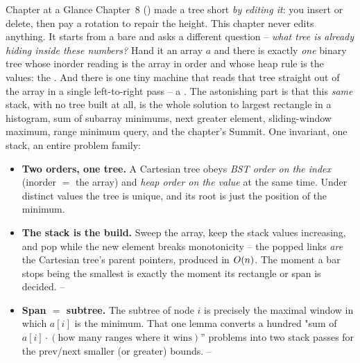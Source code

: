 
\begin{chaptertheorybox}{Chapter at a Glance}
Chapter~8 () made a tree short \emph{by editing it}: you insert or delete, then pay a
rotation to repair the height. This chapter never edits anything. It starts from a bare
 and asks a different question -- \emph{what tree is already hiding inside these
numbers?} Hand it an array $a$ and there is exactly \emph{one} binary tree whose inorder reading is
the array in order and whose heap rule is the values: the . And there is one
tiny machine that reads that tree straight out of the array in a single left-to-right pass -- a
. The astonishing part is that this \emph{same} stack, with no tree built at
all, is the whole solution to largest rectangle in a histogram, sum of subarray minimums, next
greater element, sliding-window maximum, range minimum query, and the chapter's Summit. One
invariant, one stack, an entire problem family:
\begin{itemize}[nosep]
  \item \textbf{Two orders, one tree.} A Cartesian tree obeys \emph{BST order on the index} (inorder
        $=$ the array) and \emph{heap order on the value} at the same time. Under distinct values the
        tree is unique, and its root is just the position of the minimum. \hfill {}
  \item \textbf{The stack is the build.} Sweep the array, keep the stack values increasing, and pop
        while the new element breaks monotonicity -- the popped links \emph{are} the Cartesian tree's
        parent pointers, produced in $O(n)$. The moment a bar stops being the smallest is exactly
        the moment its rectangle or span is decided. \hfill {}--
  \item \textbf{Span $=$ subtree.} The subtree of node $i$ is precisely the maximal window in which
        $a[i]$ is the minimum. That one lemma converts a hundred "sum of $a[i]\cdot(\text{how many
        ranges where it wins})$'' problems into two stack passes for the prev/next smaller (or
        greater) bounds. \hfill {}--
\end{itemize}


\end{chaptertheorybox}
